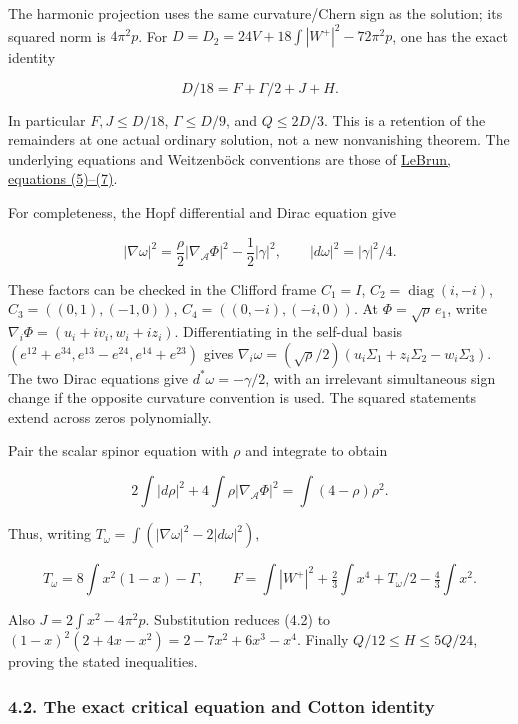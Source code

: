 \documentclass[
  10pt,
]{article}
\begin{document}
The harmonic projection uses the same curvature/Chern sign as the
solution; its squared norm is \(4\pi^2p\). For
\(D=D_2=24V+18\int|W^+|^2-72\pi^2p\), one has the exact identity

\[
                  \boxed{D/18=F+\Gamma/2+J+H.}                  \tag{4.2}
\]

In particular \(F,J\le D/18\), \(\Gamma\le D/9\), and \(Q\le2D/3\). This
is a retention of the remainders at one actual ordinary solution, not a
new nonvanishing theorem. The underlying equations and Weitzenböck
conventions are those of
\href{https://arxiv.org/pdf/math/0003068}{LeBrun, equations (5)--(7)}.

For completeness, the Hopf differential and Dirac equation give

\[
 |\nabla\omega|^2=\frac\rho2|\nabla_{\mathcal A}\Phi|^2
                                      -\frac12|\gamma|^2,
 \qquad |d\omega|^2=|\gamma|^2/4.                  \tag{4.3}
\]

These factors can be checked in the Clifford frame \(C_1=I\),
\(C_2=\operatorname{diag}(i,-i)\), \(C_3=((0,1),(-1,0))\),
\(C_4=((0,-i),(-i,0))\). At \(\Phi=\sqrt\rho\,e_1\), write
\(\nabla_i\Phi=(u_i+iv_i,w_i+iz_i)\). Differentiating in the self-dual
basis \((e^{12}+e^{34},e^{13}-e^{24},e^{14}+e^{23})\) gives
\(\nabla_i\omega=(\sqrt\rho/2)(u_i\Sigma_1+z_i\Sigma_2-w_i\Sigma_3)\).
The two Dirac equations give \(d^*\omega=-\gamma/2\), with an irrelevant
simultaneous sign change if the opposite curvature convention is used.
The squared statements extend across zeros polynomially.

Pair the scalar spinor equation with \(\rho\) and integrate to obtain

\[
 2\int|d\rho|^2+4\int\rho|\nabla_{\mathcal A}\Phi|^2
                              =\int(4-\rho)\rho^2.
\]

Thus, writing \(T_\omega=\int(|\nabla\omega|^2-2|d\omega|^2)\),

\[
 T_\omega=8\int x^2(1-x)-\Gamma,
 \qquad
 F=\int|W^+|^2+\tfrac23\int x^4+T_\omega/2-\tfrac43\int x^2.
                                                        \tag{4.4}
\]

Also \(J=2\int x^2-4\pi^2p\). Substitution reduces (4.2) to
\((1-x)^2(2+4x-x^2)=2-7x^2+6x^3-x^4\). Finally \(Q/12\le H\le5Q/24\),
proving the stated inequalities.

\hypertarget{the-exact-critical-equation-and-cotton-identity}{%
\subsubsection{4.2. The exact critical equation and Cotton
identity}\label{the-exact-critical-equation-and-cotton-identity}}
\end{document}
